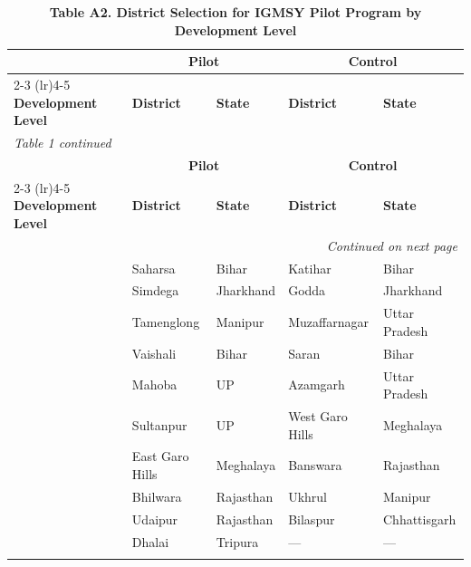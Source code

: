 \documentclass{article}
\begin{document}
\newpage 


\begin{longtable}{@{}p{2.8cm}p{3.2cm}p{3.2cm}p{3.2cm}p{3.2cm}@{}}

\caption{\textbf{Table A2. District Selection for IGMSY Pilot Program by Development Level}}
\label{tab:districts} \\

\toprule
 & \multicolumn{2}{c}{\textbf{Pilot}} & \multicolumn{2}{c}{\textbf{Control}} \\
\cmidrule(lr){2-3} \cmidrule(lr){4-5}
\textbf{Development Level} & \textbf{District} & \textbf{State} & \textbf{District} & \textbf{State} \\
\midrule
\endfirsthead

\multicolumn{5}{l}{\small\textit{Table 1 continued}} \\[4pt]
\toprule
 & \multicolumn{2}{c}{\textbf{Pilot}} & \multicolumn{2}{c}{\textbf{Control}} \\
\cmidrule(lr){2-3} \cmidrule(lr){4-5}
\textbf{Development Level} & \textbf{District} & \textbf{State} & \textbf{District} & \textbf{State} \\
\midrule
\endhead

\midrule
\multicolumn{5}{r}{\small\textit{Continued on next page}} \\
\endfoot

\bottomrule
\endlastfoot

\multirow{10}{*}{\textit{Low}}
  & Saharsa        & Bihar         & Katihar          & Bihar          \\
  & Simdega        & Jharkhand     & Godda            & Jharkhand      \\
  & Tamenglong     & Manipur       & Muzaffarnagar    & Uttar Pradesh  \\
  & Vaishali       & Bihar         & Saran            & Bihar          \\
  & Mahoba         & UP            & Azamgarh         & Uttar Pradesh  \\
  & Sultanpur      & UP            & West Garo Hills  & Meghalaya      \\
  & East Garo Hills & Meghalaya    & Banswara         & Rajasthan      \\
  & Bhilwara       & Rajasthan     & Ukhrul           & Manipur        \\
  & Udaipur        & Rajasthan     & Bilaspur         & Chhattisgarh   \\
  & Dhalai         & Tripura       & ---              & ---            \\
\addlinespace[6pt]


\end{longtable}
\end{document}
